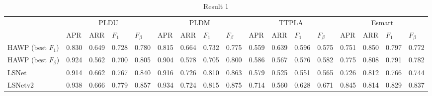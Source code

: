 \documentclass[journal]{IEEEtran}
\begin{document}

\begin{table}[]
\begin{tabular}{lllll|llll|llll|llll}
        & \multicolumn{4}{c|}{PLDU}           & \multicolumn{4}{c|}{PLDM}           & \multicolumn{4}{c|}{TTPLA}          & \multicolumn{4}{c}{Esmart}          \\ \cline{2-17} 
        & APR   & ARR   & $F_1$ & $F_{\beta}$ & APR   & ARR   & $F_1$ & $F_{\beta}$ & APR   & ARR   & $F_1$ & $F_{\beta}$ & APR   & ARR   & $F_1$ & $F_{\beta}$ \\ \hline
HAWP (best $F_1$)       & 0.830 & 0.649 & 0.728 & 0.780       & 0.815 & 0.664 & 0.732 & 0.775       & 0.559 & 0.639 & 0.596 & 0.575       & 0.751 & 0.850 & 0.797 & 0.772       \\
HAWP (best $F_\beta$)   & 0.924 & 0.562 & 0.700 & 0.805       & 0.904 & 0.578 & 0.705 & 0.800       & 0.586 & 0.567 & 0.576 & 0.582       & 0.775 & 0.808 & 0.791 & 0.782       \\
LSNet                   & 0.914 & 0.662 & 0.767 & 0.840       & 0.916 & 0.726 & 0.810 & 0.863       & 0.579 & 0.525 & 0.551 & 0.565       & 0.726 & 0.812 & 0.766 & 0.744       \\
LSNetv2                 & 0.938 & 0.666 & 0.779 & 0.857       & 0.934 & 0.724 & 0.815 & 0.875       & 0.714 & 0.560 & 0.628 & 0.671       & 0.845 & 0.814 & 0.829 & 0.837      
\end{tabular}
\caption{\label{res1_table} Result 1}
\end{table}
\end{document}
